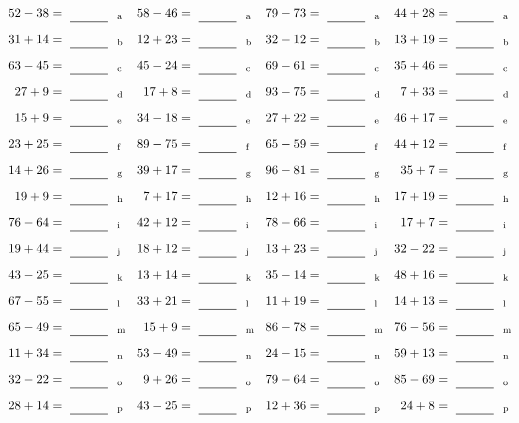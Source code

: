 \documentclass
[
  draft    = true,
  fontsize = 11pt,
  parskip  = half-
]
{scrartcl}
\begin{document}
\clearpage
\begin{align*}
    \pline{52-38}&=\rline{a}
  & \pline{58-46}&=\rline{a}
  & \pline{79-73}&=\rline{a}
  & \pline{44+28}&=\rline{a} \\[1ex]
    \pline{31+14}&=\rline{b}
  & \pline{12+23}&=\rline{b}
  & \pline{32-12}&=\rline{b}
  & \pline{13+19}&=\rline{b} \\[1ex]
    \pline{63-45}&=\rline{c}
  & \pline{45-24}&=\rline{c}
  & \pline{69-61}&=\rline{c}
  & \pline{35+46}&=\rline{c} \\[1ex]
    \pline{27+9}&=\rline{d}
  & \pline{17+8}&=\rline{d}
  & \pline{93-75}&=\rline{d}
  & \pline{7+33}&=\rline{d} \\[1ex]
    \pline{15+9}&=\rline{e}
  & \pline{34-18}&=\rline{e}
  & \pline{27+22}&=\rline{e}
  & \pline{46+17}&=\rline{e} \\[1ex]
    \pline{23+25}&=\rline{f}
  & \pline{89-75}&=\rline{f}
  & \pline{65-59}&=\rline{f}
  & \pline{44+12}&=\rline{f} \\[1ex]
    \pline{14+26}&=\rline{g}
  & \pline{39+17}&=\rline{g}
  & \pline{96-81}&=\rline{g}
  & \pline{35+7}&=\rline{g} \\[1ex]
    \pline{19+9}&=\rline{h}
  & \pline{7+17}&=\rline{h}
  & \pline{12+16}&=\rline{h}
  & \pline{17+19}&=\rline{h} \\[1ex]
    \pline{76-64}&=\rline{i}
  & \pline{42+12}&=\rline{i}
  & \pline{78-66}&=\rline{i}
  & \pline{17+7}&=\rline{i} \\[1ex]
    \pline{19+44}&=\rline{j}
  & \pline{18+12}&=\rline{j}
  & \pline{13+23}&=\rline{j}
  & \pline{32-22}&=\rline{j} \\[1ex]
    \pline{43-25}&=\rline{k}
  & \pline{13+14}&=\rline{k}
  & \pline{35-14}&=\rline{k}
  & \pline{48+16}&=\rline{k} \\[1ex]
    \pline{67-55}&=\rline{l}
  & \pline{33+21}&=\rline{l}
  & \pline{11+19}&=\rline{l}
  & \pline{14+13}&=\rline{l} \\[1ex]
    \pline{65-49}&=\rline{m}
  & \pline{15+9}&=\rline{m}
  & \pline{86-78}&=\rline{m}
  & \pline{76-56}&=\rline{m} \\[1ex]
    \pline{11+34}&=\rline{n}
  & \pline{53-49}&=\rline{n}
  & \pline{24-15}&=\rline{n}
  & \pline{59+13}&=\rline{n} \\[1ex]
    \pline{32-22}&=\rline{o}
  & \pline{9+26}&=\rline{o}
  & \pline{79-64}&=\rline{o}
  & \pline{85-69}&=\rline{o} \\[1ex]
    \pline{28+14}&=\rline{p}
  & \pline{43-25}&=\rline{p}
  & \pline{12+36}&=\rline{p}
  & \pline{24+8}&=\rline{p}
\end{align*}
\end{document}
